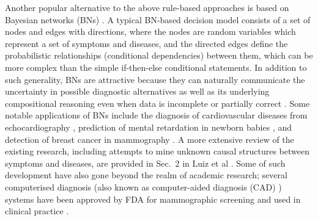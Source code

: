 Another popular alternative to the above rule-based approaches is based on Bayesian networks (BNs) \cite{pearl2014probabilistic}. A typical BN-based decision model consists of a set of nodes and edges with directions, where the nodes are random variables which represent a set of symptoms and diseases, and the directed edges define the probabilistic relationships (conditional dependencies) between them, which can be more complex than the simple if-then-else conditional statements. In addition to such generality, BNs are attractive because they can naturally communicate the uncertainty in possible diagnostic alternatives as well as its underlying compositional reasoning even when data is incomplete or partially correct \cite{nikovski2000constructing}. Some notable applications of BNs include the diagnosis of cardiovascular diseases from echocardiography \cite{diez1997diaval}, prediction of mental retardation in newborn babies \cite{mani1997mentor}, and detection of breast cancer in mammography \cite{kahn1997construction,sajda2003multi,burnside2004probabilistic}. A more extensive review of the existing research, including attempts to mine unknown causal structures between symptoms and diseases, are provided in Sec.~2 in Luiz et al \cite{seixas2014bayesian}. Some of such development have also gone beyond the realm of academic research; several computerised diagnosis (also known as computer-aided diagnosis (CAD) \cite{doi1993digital}) systems have been approved by FDA for mammographic screening  and used in clinical practice \cite{sajda2006machine}. 




